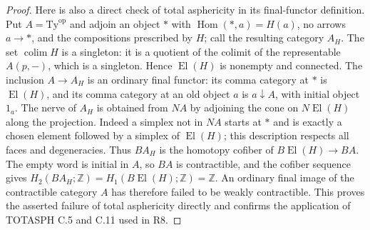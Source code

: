 \begin{proof}
Here is also a direct check of total asphericity in its final-functor
definition. Put $A=\mathrm{Ty}^{\mathrm{op}}$ and adjoin an object
$*$ with $\operatorname{Hom}(*,a)=H(a)$, no arrows $a\to *$,
and the compositions prescribed by $H$; call the resulting category
$A_H$. The set $\operatorname{colim}H$ is a singleton: it is a
quotient of the colimit of the representable $A(p,-)$, which is a
singleton. Hence $\operatorname{El}(H)$ is nonempty and connected.
The inclusion $A\to A_H$ is an ordinary final functor: its comma
category at $*$ is $\operatorname{El}(H)$, and its comma category
at an old object $a$ is $a\downarrow A$, with initial object $1_a$.
The nerve of $A_H$ is obtained from $NA$ by adjoining the cone on
$N\operatorname{El}(H)$ along the projection. Indeed a simplex
not in $NA$ starts at $*$ and is exactly a chosen element followed
by a simplex of $\operatorname{El}(H)$; this description respects
all faces and degeneracies. Thus $BA_H$ is the homotopy cofiber of
$B\operatorname{El}(H)\to BA$. The empty word is initial in $A$,
so $BA$ is contractible, and the cofiber sequence gives
$H_2(BA_H;\mathbb Z)=H_1(B\operatorname{El}(H);\mathbb Z)=\mathbb Z$.
An ordinary final image of the contractible category $A$ has
therefore failed to be weakly contractible. This proves the asserted
failure of total asphericity directly and confirms the application
of TOTASPH C.5 and C.11 used in R8.
\end{proof}

